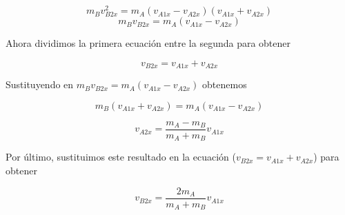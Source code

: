 \documentclass{article}
\begin{document}
    \[ m_B v_{B2x}^2 = m_A (v_{A1x} - v_{A2x})(v_{A1x} + v_{A2x}) \]
    \[ m_B v_{B2x} = m_A (v_{A1x} - v_{A2x}) \]

    \par Ahora dividimos la primera ecuación entre la segunda para obtener

    \[ v_{B2x} = v_{A1x} + v_{A2x} \]

    \par Sustituyendo en $m_B v_{B2x} = m_A (v_{A1x} - v_{A2x})$ obtenemos

    \[ m_B (v_{A1x} + v_{A2x}) = m_A (v_{A1x} - v_{A2x}) \]

    \[ v_{A2x} = \frac{m_A - m_B}{m_A + m_B} v_{A1x} \]

    \par Por último, sustituimos este resultado en la ecuación ($v_{B2x} = v_{A1x} + v_{A2x}$) para obtener

    \[ v_{B2x} = \frac{2 m_A}{m_A + m_B} v_{A1x} \]
\end{document}
